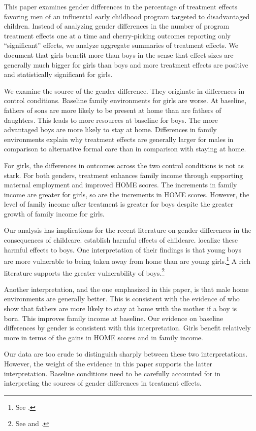 This paper examines gender differences in the percentage of treatment effects favoring men of an influential early childhood program targeted to disadvantaged children. Instead of  analyzing gender differences in the number of program treatment effects one at a time and cherry-picking outcomes reporting only ``significant'' effects, we analyze aggregate summaries of treatment effects. We document that girls benefit more than boys in the sense that effect sizes are generally much bigger for girls than boys and more treatment effects are positive and statistically significant for girls.

We examine the source of the gender difference. They originate in differences in control conditions. Baseline family environments for girls are worse. At baseline, fathers of sons are more likely to be present at home than are fathers of daughters. This leads to more resources at baseline for boys. The more advantaged boys are more likely to stay at home. Differences in family environments explain why treatment effects are generally larger for males in comparison to alternative formal care than in comparison with staying at home.

For girls, the differences in outcomes across the two control conditions is not as stark. For both genders, treatment enhances family income through supporting maternal employment and improved HOME scores. The increments in family income are greater for girls, so are the increments in HOME scores. However, the level of family income after treatment is greater for boys despite the greater growth of family income for girls.

Our analysis has implications for the recent literature on gender differences in the consequences of childcare. \citet{Baker_etal_2008_Universal_Childcare_JPE,Baker_Gruber_Milligan_2015_Noncog_Defects} establish harmful effects of childcare. \citet{Kottelenberg_Lehrer_2014_Gender-Effects} localize these harmful effects to boys. One interpretation of their findings is that young boys are more vulnerable to being taken away from home than are young girls.\footnote{See \citet{Garcia_etal_2019_ECE_IMHJ}.} A rich literature supports the greater vulnerability of boys.\footnote{See \citet{Golding_Fitzgerald_2017_IMHJ} and \citet{Schore_2017_IMHJ}.}

Another interpretation, and the one emphasized in this paper, is that male home environments are generally better. This is consistent with the evidence of \citet{Dahl_Moretti_2008_RES} who show that fathers are more likely to stay at home with the mother if a boy is born. This improves family income at baseline. Our evidence on baseline differences by gender is consistent with this interpretation. Girls benefit relatively more in terms of the gains in HOME scores and in family income.

Our data are too crude to distinguish sharply between these two interpretations. However, the weight of the evidence in this paper supports the latter interpretation. Baseline conditions need to be carefully accounted for in interpreting the sources of gender differences in treatment effects. 